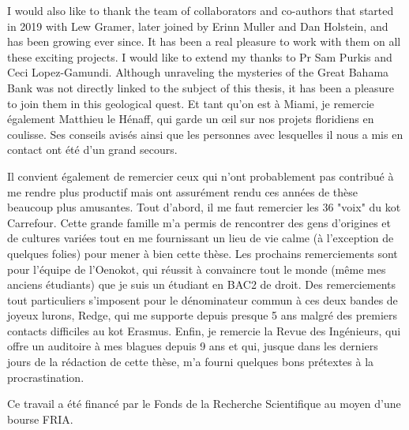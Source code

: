 I would also like to thank the team of collaborators and co-authors that started in 2019 with Lew Gramer, later joined by Erinn Muller and Dan Holstein, and has been growing ever since. It has been a real pleasure to work with them on all these exciting projects. I would like to extend my thanks to Pr Sam Purkis and Ceci Lopez-Gamundi. Although unraveling the mysteries of the Great Bahama Bank was not directly linked to the subject of this thesis, it has been a pleasure to join them in this geological quest. Et tant qu’on est à Miami, je remercie également Matthieu le Hénaff, qui garde un œil sur nos projets floridiens en coulisse. Ses conseils avisés ainsi que les personnes avec lesquelles il nous a mis en contact ont été d’un grand secours.

Il convient également de remercier ceux qui n'ont probablement pas contribué à me rendre plus productif mais ont assurément rendu ces années de thèse beaucoup plus amusantes. Tout d'abord, il me faut remercier les 36 "voix" du kot Carrefour. Cette grande famille m'a permis de rencontrer des gens d'origines et de cultures variées tout en me fournissant un lieu de vie calme (à l’exception de quelques folies) pour mener à bien cette thèse. Les prochains remerciements sont pour l’équipe de l'Oenokot, qui réussit à convaincre tout le monde (même mes anciens étudiants) que je suis un étudiant en BAC2 de droit. Des remerciements tout particuliers s'imposent pour le dénominateur commun à ces deux bandes de joyeux lurons, Redge, qui me supporte depuis presque 5 ans malgré des premiers contacts difficiles au kot Erasmus. Enfin, je remercie la Revue des Ingénieurs, qui offre un auditoire à mes blagues depuis 9 ans et qui, jusque dans les derniers jours de la rédaction de cette thèse, m’a fourni quelques bons prétextes à la procrastination.

\vspace{3em}

Ce travail a été financé par le Fonds de la Recherche Scientifique au moyen d’une bourse FRIA.
